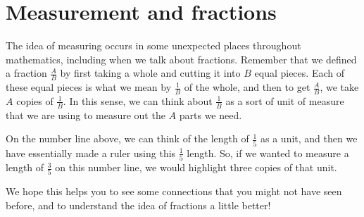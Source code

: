 \documentclass{ximera}
\begin{document}
\section{Measurement and fractions}
The idea of measuring occurs in some unexpected places throughout mathematics, including when we talk about fractions. Remember that we defined a fraction $\frac{A}{B}$ by first taking a whole and cutting it into $B$ equal pieces. Each of these equal pieces is what we mean by $\frac{1}{B}$ of the whole, and then to get $\frac{A}{B}$, we take $A$ copies of $\frac{1}{B}$. In this sense, we can think about $\frac{1}{B}$ as a sort of unit of measure that we are using to measure out the $A$ parts we need.
\begin{center}
\end{center}
On the number line above, we can think of the length of $\frac{1}{5}$ as a unit, and then we have essentially made a ruler using this $\frac{1}{5}$ length. So, if we wanted to measure a length of $\frac{3}{5}$ on this number line, we would highlight three copies of that unit.

\begin{center}
\end{center}

We hope this helps you to see some connections that you might not have seen before, and to understand the idea of fractions a little better!
\end{document}
